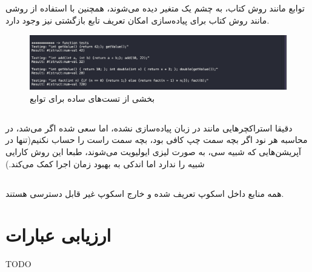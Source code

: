 \documentclass{article}
\begin{document}
\subsection{}
توابع مانند روش کتاب، به چشم یک متغیر دیده می‌شوند، همچنین با استفاده از روشی مانند روش کتاب برای پیاده‌سازی 
امکان تعریف تابع بازگشتی نیز وجود دارد.
\begin{figure}[h]
        \centering
        \includegraphics[width=1\linewidth]{pics/func1.png}
        \caption{بخشی از تست‌های ساده برای توابع}
\end{figure}
\subsection{}
دقیقا استراکچر‌‌هایی مانند 
در زبان پیاده‌سازی نشده، اما سعی شده اگر می‌شد، در محاسبه 
هر نود 
اگر بچه سمت چپ کافی بود، بچه سمت راست را حساب نکنیم(تنها در آپریشن‌هایی که شبیه سی، به صورت لیزی ایولیویت می‌شوند، طبعا این روش کارایی شبیه  را ندارد اما اندکی به بهبود زمان اجرا کمک می‌کند.)
\subsection{}
همه منابع داخل اسکوپ تعریف شده و خارج اسکوپ غیر قابل دسترسی هستند.
\section{ارزیابی عبارات}
TODO
\end{document}
